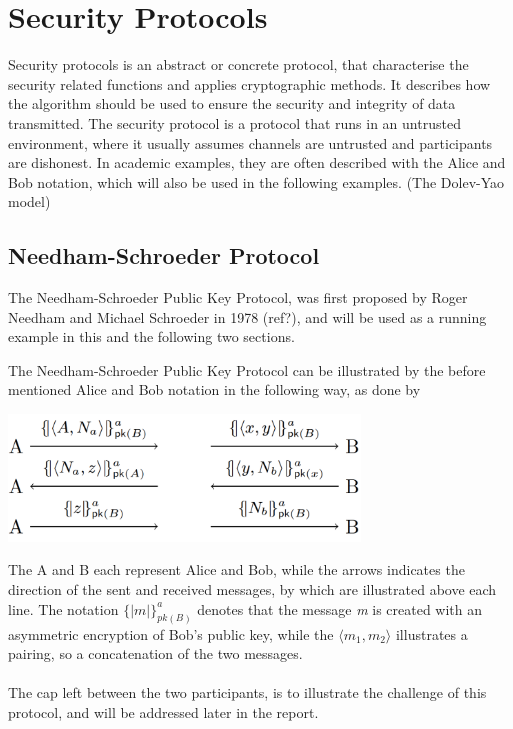 \section{Security Protocols} %
Security protocols is an abstract or concrete protocol, that characterise the security related functions and applies cryptographic methods. It describes how the algorithm should be used to ensure the security and integrity of data transmitted. The security protocol is a protocol that runs in an untrusted environment, where it usually assumes channels are untrusted and participants are dishonest. In academic examples, they are often described with the Alice and Bob notation, which will also be used in the following examples. (The Dolev-Yao model) 


\subsection{Needham-Schroeder Protocol}
The Needham-Schroeder Public Key Protocol, was first proposed by Roger Needham and Michael Schroeder in 1978 (ref?), and will be used as a running example in this and the following two sections. %

The Needham-Schroeder Public Key Protocol can be illustrated by the before mentioned Alice and Bob notation in the following way, as done by \citeauthor{DBLP:journals/ftpl/CortierK14}

\begin{center}
\includegraphics[width=0.7\textwidth, angle=0]{Graphics/NS_Protocol.pdf}
\end{center}

The A and B each represent Alice and Bob, while the arrows indicates the direction of the sent and received messages, by which are illustrated above each line. The notation $\{| m |\}^a_{pk(B)}$ denotes that the message \textit{m} is created with an asymmetric encryption of Bob's public key, while the $\langle m_1, m_2 \rangle$ illustrates a pairing, so a concatenation of the two messages. 
\\ \\The cap left between the two participants, is to illustrate the challenge of this protocol, and will be addressed later in the report. 

